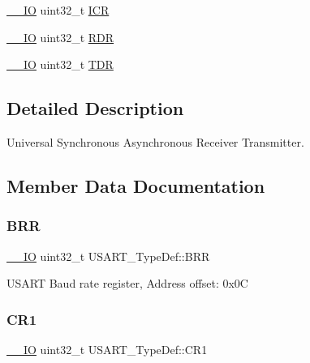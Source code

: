 \begin{DoxyCompactItemize}
\item 
\mbox{\hyperlink{core__sc300_8h_aec43007d9998a0a0e01faede4133d6be}{\+\_\+\+\_\+\+IO}} uint32\+\_\+t \mbox{\hyperlink{struct_u_s_a_r_t___type_def_ab6d6dd2af5463e9e3df458557e09f6cf}{I\+CR}}
\item 
\mbox{\hyperlink{core__sc300_8h_aec43007d9998a0a0e01faede4133d6be}{\+\_\+\+\_\+\+IO}} uint32\+\_\+t \mbox{\hyperlink{struct_u_s_a_r_t___type_def_a8d538b7390289142b70428c5b0af0a18}{R\+DR}}
\item 
\mbox{\hyperlink{core__sc300_8h_aec43007d9998a0a0e01faede4133d6be}{\+\_\+\+\_\+\+IO}} uint32\+\_\+t \mbox{\hyperlink{struct_u_s_a_r_t___type_def_a315ab2fb3869668e7c5c12e8204efe10}{T\+DR}}
\end{DoxyCompactItemize}


\subsection{Detailed Description}
Universal Synchronous Asynchronous Receiver Transmitter. 

\subsection{Member Data Documentation}
\mbox{\label{struct_u_s_a_r_t___type_def_a6ef06ba9d8dc2dc2a0855766369fa7c9}} 
\subsubsection{\texorpdfstring{BRR}{BRR}}
{\footnotesize\ttfamily \mbox{\hyperlink{core__sc300_8h_aec43007d9998a0a0e01faede4133d6be}{\+\_\+\+\_\+\+IO}} uint32\+\_\+t U\+S\+A\+R\+T\+\_\+\+Type\+Def\+::\+B\+RR}

U\+S\+A\+RT Baud rate register, Address offset\+: 0x0C \mbox{\label{struct_u_s_a_r_t___type_def_a6d7dcd3972a162627bc3470cbf992ec4}} 
\subsubsection{\texorpdfstring{CR1}{CR1}}
{\footnotesize\ttfamily \mbox{\hyperlink{core__sc300_8h_aec43007d9998a0a0e01faede4133d6be}{\+\_\+\+\_\+\+IO}} uint32\+\_\+t U\+S\+A\+R\+T\+\_\+\+Type\+Def\+::\+C\+R1}

